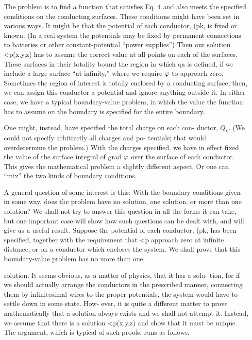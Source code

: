 The problem is to find a function that satisfies Eq. 4 and also meets
the specified conditions on the conducting surfaces. These conditions
might have been set in various ways. It might be that the potential
of each conductor, (pk, is fixed or known. (In a real system
the potentials may be fixed by permanent connections to batteries
or other constant-potential ``power supplies'') Then our solution
<p(x,y,z) has to assume the correct value at all points on each of the
surfaces. These surfaces in their totality bound the region in which
qa is defined, if we include a large surface ``at infinity,'' where we
require $\varphi$ to approach zero. Sometimes the region of interest is
totally enclosed by a conducting surface; then, we can assign this
conductor a potential and ignore anything outside it. In either case,
we have a typical boundary-value problem, in which the value the
function has to assume on the boundary is specified for the entire
boundary.

One might, instead, have specified the total charge on each con-
ductor, $Q_k$. (We could not specify arbitrarily all charges and po-
tentials; that would overdetermine the problem.) With the charges
specified, we have in effect fixed the value of the surface integral of
grad $\varphi$ over the surface of each conductor. This gives the mathematical
problem a slightly different aspect. Or one can ``mix'' the
two kinds of boundary conditions.

A general question of some interest is this: With the boundary
conditions given in some way, does the problem have no solution,
one solution, or more than one solution? We shall not try to answer
this question in all the forms it can take, but one important case will
show how such questions can be dealt with, and will give us a useful
result. Suppose the potential of each conductor, (pk, has been
specified, together with the requirement that <p approach zero at
infinite distance, or on a conductor which encloses the system. We
shall prove that this boundary-value problem has no more than one

solution. It seems obvious, as a matter of physics, that it has a solu-
tion, for if we should actually arrange the conductors in the prescribed
manner, connecting them by infinitesimal wires to the proper
potentials, the system would have to settle down in some state. How-
ever, it is quite a different matter to prove mathematically that a solution
always exists and we shall not attempt it. Instead, we assume
that there is a solution <p(x,y,z) and show that it must be unique.
The argument, which is typical of such proofs, runs as follows.


